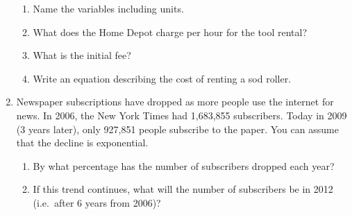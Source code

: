 \documentclass[12pt]{article}
\begin{document}
\begin{enumerate}
\begin{enumerate}
\item Name the variables including units.
\vfill
\item What does the Home Depot charge per hour for the tool rental?
\vfill
\item What is the initial fee?
\vfill
\item Write an equation describing the cost of renting a sod roller.
\vfill
\end{enumerate}

\newpage %
\item Newspaper subscriptions have dropped as more people use the internet for news.  In 2006, the New York Times had 1,683,855 subscribers.  Today in 2009 (3 years later), only 927,851 people subscribe to the paper. You can assume that the decline is exponential.

\begin{enumerate}
\item By what percentage has the number of subscribers dropped each year?
\vfill
\item If this trend continues, what will the number of subscribers be in 2012 (i.e.\ after 6 years from 2006)?
\vfill
\end{enumerate}



\end{enumerate}
\end{document}
